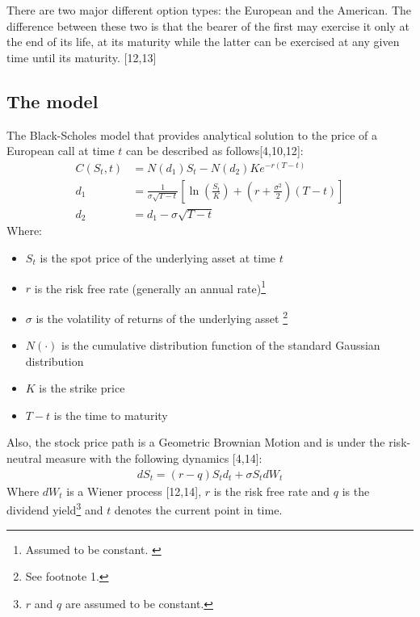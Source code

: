 \documentclass[12pt,twoside]{reedthesis}
\providecommand{\tightlist}{%
  \setlength{\itemsep}{0pt}\setlength{\parskip}{0pt}}
\theoremstyle{definition}
\theoremstyle{definition}
\theoremstyle{remark}
\begin{document}
  There are two major different option types: the European and the
  American. The difference between these two is that the bearer of the
  first may exercise it only at the end of its life, at its maturity while
  the latter can be exercised at any given time until its maturity.
  {[}12,13{]}
  
  \subsection{The model}\label{the-model}
  
  The Black-Scholes model that provides analytical solution to the price
  of a European call at time \(t\) can be described as
  follows{[}4,10,12{]}:
  \begin{align}
  C(S_{t},t)&=N(d_{1})S_{t}-N(d_{2})Ke^{-r(T-t)}\\[10pt]
  d_{1}&={\frac {1}{\sigma {\sqrt {T-t}}}}\left[\ln \left({\frac {S_{t}}{K}}\right)+\left(r+{\frac {\sigma ^{2}}{2}}\right)(T-t)\right]\\[10pt]
  d_{2}&=d_{1}-\sigma {\sqrt {T-t}}
  \end{align}
  \noindent
  Where:
  \begin{itemize}
  \tightlist
  \item
    \(S_{t}\) is the spot price of the underlying asset at time \(t\)
  \item
    \(r\) is the risk free rate (generally an annual
    rate)\footnote{Assumed to be constant. \label{teste}}
  \item
    \(\sigma\) is the volatility of returns of the underlying asset
    \footnote{See footnote 1.}
  \item
    \(N(\cdot )\) is the cumulative distribution function of the standard
    Gaussian distribution
  \item
    \(K\) is the strike price
  \item
    \(T-t\) is the time to maturity
  \end{itemize}
  \noindent
  Also, the stock price path is a Geometric Brownian Motion and is under
  the risk-neutral measure with the following dynamics {[}4,14{]}:
  \begin{align}
  dS_{t} = (r-q)S_td_t+\sigma S_t dW_t
  \end{align}
  \noindent
  Where \(dW_t\) is a Wiener process {[}12,14{]}, \(r\) is the risk free
  rate and \(q\) is the dividend
  yield\footnote{$r$ and $q$ are assumed to be constant.} and \(t\)
  denotes the current point in time.
  
\end{document}
